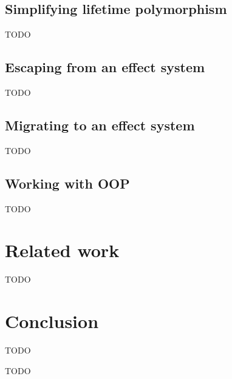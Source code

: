 \documentclass[acmsmall,review,screen]{acmart}
\begin{document}
\subsection{Simplifying lifetime polymorphism} \label{subsec:lifetime-elision}


TODO %

\subsection{Escaping from an effect system}


TODO %

\subsection{Migrating to an effect system}

TODO %

\subsection{Working with OOP}


TODO %


\section{Related work} \label{sec:related}



TODO %




\section{Conclusion} \label{sec:conclusion}

TODO %


\begin{acks}
    TODO %
\end{acks}




\end{document}
